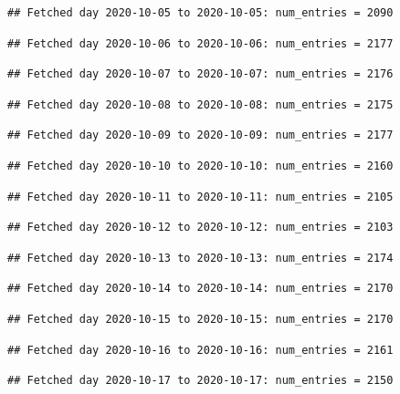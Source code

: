 \documentclass[]{article}
\begin{document}
\begin{verbatim}
## Fetched day 2020-10-05 to 2020-10-05: num_entries = 2090
\end{verbatim}

\begin{verbatim}
## Fetched day 2020-10-06 to 2020-10-06: num_entries = 2177
\end{verbatim}

\begin{verbatim}
## Fetched day 2020-10-07 to 2020-10-07: num_entries = 2176
\end{verbatim}

\begin{verbatim}
## Fetched day 2020-10-08 to 2020-10-08: num_entries = 2175
\end{verbatim}

\begin{verbatim}
## Fetched day 2020-10-09 to 2020-10-09: num_entries = 2177
\end{verbatim}

\begin{verbatim}
## Fetched day 2020-10-10 to 2020-10-10: num_entries = 2160
\end{verbatim}

\begin{verbatim}
## Fetched day 2020-10-11 to 2020-10-11: num_entries = 2105
\end{verbatim}

\begin{verbatim}
## Fetched day 2020-10-12 to 2020-10-12: num_entries = 2103
\end{verbatim}

\begin{verbatim}
## Fetched day 2020-10-13 to 2020-10-13: num_entries = 2174
\end{verbatim}

\begin{verbatim}
## Fetched day 2020-10-14 to 2020-10-14: num_entries = 2170
\end{verbatim}

\begin{verbatim}
## Fetched day 2020-10-15 to 2020-10-15: num_entries = 2170
\end{verbatim}

\begin{verbatim}
## Fetched day 2020-10-16 to 2020-10-16: num_entries = 2161
\end{verbatim}

\begin{verbatim}
## Fetched day 2020-10-17 to 2020-10-17: num_entries = 2150
\end{verbatim}
\end{document}
